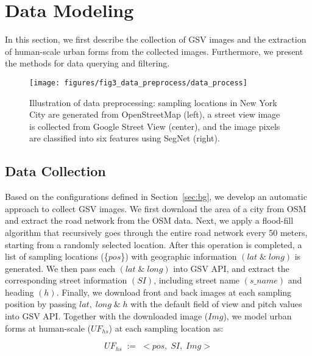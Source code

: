 \section{Data Modeling}
In this section, we first describe the collection of GSV images and the extraction of human-scale urban forms from the collected images.
Furthermore, we present the methods for data querying and filtering.

\begin{figure}[t]
	\centering
	\texttt{[image: figures/fig3\_data\_preprocess/data\_process]}
	\vspace{-7mm}
	\caption{Illustration of data preprocessing: sampling locations in New York City are generated from OpenStreetMap (left), a street view image is collected from Google Street View (center), and the image pixels are classified into six features using SegNet (right).}
	\label{fig:data_preprocess}
	\vspace{-4mm}
\end{figure}

\subsection{Data Collection}
\label{ssec:data_collection}

Based on the configurations defined in Section~\ref{sec:bg}, we develop an automatic approach to collect GSV images.
We first download the area of a city from OSM~\cite{osm_api} and extract the road network from the OSM data.
Next, we apply a flood-fill algorithm that recursively goes through the entire road network every 50 meters, starting from a randomly selected location.
After this operation is completed, a list of sampling locations (\{$pos$\}) with geographic information $(lat \; \& \; long)$ is generated.
We then pass each $(lat \; \& \; long)$ into GSV API, and extract the corresponding street information $(SI)$, including street name $(s\_name)$ and heading $(h)$. 
Finally, we download front and back images at each sampling position by passing $lat, \; long \; \& \; h$ with the default field of view and pitch values into GSV API.
Together with the downloaded image ($Img$), we model urban forms at human-scale ($UF_{hs}$) at each sampling location as: 

\vspace*{-2mm}
\begin{equation}
\label{eq_sv}
UF_{hs} \; := \; <pos, \; SI, \; Img>
\end{equation}

